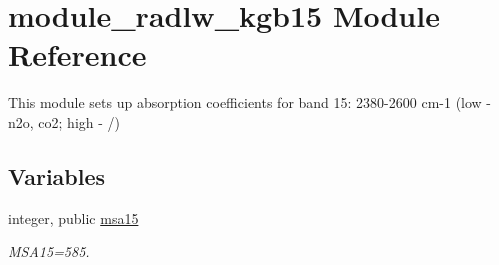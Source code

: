 \hypertarget{namespacemodule__radlw__kgb15}{}\section{module\+\_\+radlw\+\_\+kgb15 Module Reference}
\label{namespacemodule__radlw__kgb15}


This module sets up absorption coefficients for band 15\+: 2380-\/2600 cm-\/1 (low -\/ n2o, co2; high -\/ /)  


\subsection*{Variables}
\begin{DoxyCompactItemize}
\item 
\mbox{\label{namespacemodule__radlw__kgb15_abb9e98034166a07a6e349631d7fbb2a3}} 
integer, public \hyperlink{namespacemodule__radlw__kgb15_abb9e98034166a07a6e349631d7fbb2a3}{msa15}
\begin{DoxyCompactList}\small\item\em M\+S\+A15=585. \end{DoxyCompactList}\end{DoxyCompactItemize}
